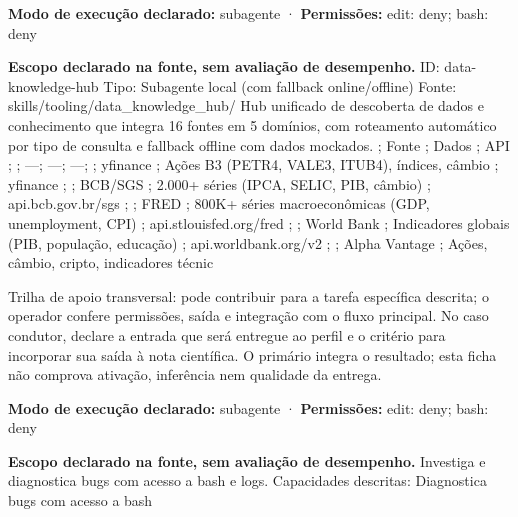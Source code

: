 \begin{arquitetura}
\textbf{Modo de execução declarado:} subagente · \textbf{Permissões:} edit: deny; bash: deny
\end{arquitetura}


\begin{descricao}
\textbf{Escopo declarado na fonte, sem avaliação de desempenho.}
ID: data-knowledge-hub Tipo: Subagente local (com fallback online/offline) Fonte: skills/tooling/data\_knowledge\_hub/ Hub unificado de descoberta de dados e conhecimento que integra 16 fontes em 5 domínios, com roteamento automático por tipo de consulta e fallback offline com dados mockados. ; Fonte ; Dados ; API ; ; ---; ---; ---; ; yfinance ; Ações B3 (PETR4, VALE3, ITUB4), índices, câmbio ; yfinance ; ; BCB/SGS ; 2.000+ séries (IPCA, SELIC, PIB, câmbio) ; api.bcb.gov.br/sgs ; ; FRED ; 800K+ séries macroeconômicas (GDP, unemployment, CPI) ; api.stlouisfed.org/fred ; ; World Bank ; Indicadores globais (PIB, população, educação) ; api.worldbank.org/v2 ; ; Alpha Vantage ; Ações, câmbio, cripto, indicadores técnic
\end{descricao}

\begin{funcao}
Trilha de apoio transversal: pode contribuir para a tarefa específica descrita; o operador confere permissões, saída e integração com o fluxo principal. No caso condutor, declare a entrada que será entregue ao perfil e o critério para incorporar sua saída à nota científica. O primário integra o resultado; esta ficha não comprova ativação, inferência nem qualidade da entrega.
\end{funcao}

\begin{arquitetura}
\textbf{Modo de execução declarado:} subagente · \textbf{Permissões:} edit: deny; bash: deny
\end{arquitetura}


\begin{descricao}
\textbf{Escopo declarado na fonte, sem avaliação de desempenho.}
Investiga e diagnostica bugs com acesso a bash e logs. Capacidades descritas: Diagnostica bugs com acesso a bash
\end{descricao}

